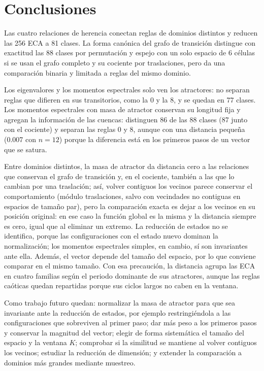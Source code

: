 \section{Conclusiones}
\label{sec:conclusions}

Las cuatro relaciones de herencia conectan reglas de dominios distintos y reducen las 256 ECA a 81 clases. La forma canónica del grafo de transición distingue con exactitud las 88 clases por permutación y espejo con un solo espacio de 6 células si se usan el grafo completo y su cociente por traslaciones, pero da una comparación binaria y limitada a reglas del mismo dominio.

Los eigenvalores y los momentos espectrales solo ven los atractores: no separan reglas que difieren en sus transitorios, como la 0 y la 8, y se quedan en 77 clases. Los momentos espectrales con masa de atractor conservan su longitud fija y agregan la información de las cuencas: distinguen 86 de las 88 clases (87 junto con el cociente) y separan las reglas 0 y 8, aunque con una distancia pequeña (0.007 con $n = 12$) porque la diferencia está en los primeros pasos de un vector que se satura.

Entre dominios distintos, la masa de atractor da distancia cero a las relaciones que conservan el grafo de transición y, en el cociente, también a las que lo cambian por una traslación; así, volver contiguos los vecinos parece conservar el comportamiento (módulo traslaciones, salvo con vecindades no contiguas en espacios de tamaño par), pero la comparación exacta es dejar a los vecinos en su posición original: en ese caso la función global es la misma y la distancia siempre es cero, igual que al eliminar un extremo. La reducción de estados no se identifica, porque las configuraciones con el estado nuevo dominan la normalización; los momentos espectrales simples, en cambio, sí son invariantes ante ella. Además, el vector depende del tamaño del espacio, por lo que conviene comparar en el mismo tamaño. Con esa precaución, la distancia agrupa las ECA en cuatro familias según el periodo dominante de sus atractores, aunque las reglas caóticas quedan repartidas porque sus ciclos largos no caben en la ventana.

Como trabajo futuro quedan: normalizar la masa de atractor para que sea invariante ante la reducción de estados, por ejemplo restringiéndola a las configuraciones que sobreviven al primer paso; dar más peso a los primeros pasos y conservar la magnitud del vector; elegir de forma sistemática el tamaño del espacio y la ventana $K$; comprobar si la similitud se mantiene al volver contiguos los vecinos; estudiar la reducción de dimensión; y extender la comparación a dominios más grandes mediante muestreo.
